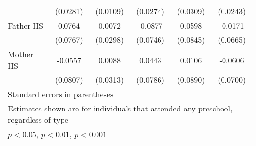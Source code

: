 \begin{table}[htbp]
\begin{tabular}{l*{5}{c}}
            &    (0.0281)         &    (0.0109)         &    (0.0274)         &    (0.0309)         &    (0.0243)         \\
\addlinespace
Father HS   &      0.0764         &      0.0072         &     -0.0877         &      0.0598         &     -0.0171         \\
            &    (0.0767)         &    (0.0298)         &    (0.0746)         &    (0.0845)         &    (0.0665)         \\
\addlinespace
Mother HS   &     -0.0557         &      0.0088         &      0.0443         &      0.0106         &     -0.0606         \\
            &    (0.0807)         &    (0.0313)         &    (0.0786)         &    (0.0890)         &    (0.0700)         \\
\bottomrule
\multicolumn{6}{l}{\footnotesize Standard errors in parentheses}\\
\multicolumn{6}{l}{\footnotesize Estimates shown are for individuals that attended any preschool, regardless of type}\\
\multicolumn{6}{l}{\footnotesize \sym{*} \(p<0.05\), \sym{**} \(p<0.01\), \sym{***} \(p<0.001\)}\\
\end{tabular}
\end{table}
